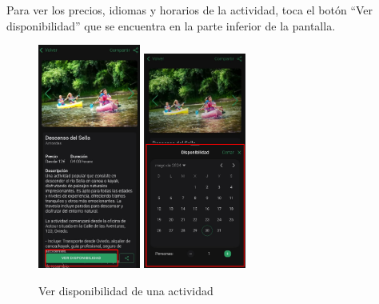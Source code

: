 Para ver los precios, idiomas y horarios de la actividad, toca el botón “Ver disponibilidad” que se encuentra en la parte inferior de la pantalla.
\begin{figure}[H]
	\centering
	\includegraphics[width=0.3\textwidth]{7-Construccion/Manuales/app/P3-Actividad.png}
	\includegraphics[width=0.3\textwidth]{7-Construccion/Manuales/app/P4-Actividad.png}
	\caption{Ver disponibilidad de una actividad}
\end{figure}

